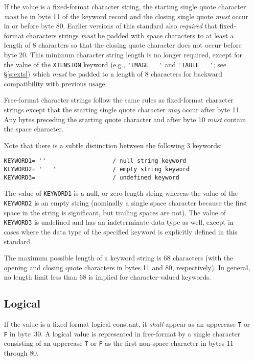 \documentclass[11pt,makeidx]{book}     %
\begin{document}
   If the value is a fixed-format character string, the starting
   single quote character {\em must} be in byte 11 of the keyword record
   and the closing single quote {\em must} occur in or before byte 80.  
   Earlier versions of this standard also {\em required}
   that fixed-format characters strings {\em must} be padded with space characters
   to  at least a length of 8 characters so that the closing quote character
   does not occur before byte 20.  This minimum character string length is
   no longer required, except for the value of the {\tt XTENSION} keyword
   (e.g., {\verb*+'IMAGE   '+} and {\verb*+'TABLE   '+}; see \S\ref{s:exts})
   which {\em must} be padded to a length of 8 characters 
   for backward compatibility with previous usage.

Free-format character strings follow the same rules as fixed-format
character strings except that the starting single quote
character {\em may} occur after byte 11.  
Any bytes preceding the starting quote character and after
byte 10 {\em must} contain the space character.

Note that there is a subtle distinction between the following 3 keywords:
\begin{verbatim}
KEYWORD1= ''                   / null string keyword
KEYWORD2= '   '                / empty string keyword
KEYWORD3=                      / undefined keyword

\end{verbatim}
\noindent
The value of {\tt KEYWORD1} is a null, or zero length string whereas the
value of the {\tt KEYWORD2} is an empty string (nominally a single space
character because the first space in the string is significant, but
trailing spaces are not).  The value of {\tt KEYWORD3} is undefined and has
an indeterminate data type as well, except in cases where the data type
of the specified keyword is explicitly defined in this standard.

The maximum possible length of a keyword string is 68 characters (with
the opening and closing quote characters in bytes 11 and 80,
respectively).  In general, no length limit less than 68 is implied
for character-valued keywords.

   \subsection{Logical}
   \label{s:ffl}
   If the value is a fixed-format logical constant, it {\em shall} appear as
   an uppercase {\tt T} or {\tt F} in byte~30.
   A logical value is represented in free-format by a single character 
   consisting of an uppercase {\tt T} or {\tt F} as the first 
   non-space character in bytes 11 through 80.
\end{document}
